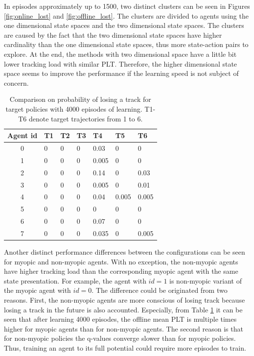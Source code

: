 \documentclass[english, 12pt, a4paper, elec, utf8, a-1b, online]{aaltothesis}
\begin{document}
In episodes approximately up to 1500, two distinct clusters can be seen in Figures \ref{fig:online_lost} and \ref{fig:offline_lost}.
The clusters are divided to agents using the one dimensional state spaces and the two dimensional state spaces.
The clusters are caused by the fact that the two dimensional state spaces have higher cardinality than the one dimensional state spaces, thus more state-action pairs to explore.
At the end, the methods with two dimensional space have a little bit lower tracking load with similar PLT.
Therefore, the higher dimensional state space seems to improve the performance if the learning speed is not subject of concern.

\begin{table}[tb]
    \centering
    \begin{tabular}{|c|l|l|l|l|l|l|}
        \hline
        \textbf{Agent id} & \textbf{T1} & \textbf{T2} & \textbf{T3} & \textbf{T4} & \textbf{T5} & \textbf{T6} \\ \hline
        0 & 0 & 0 & 0 & 0.03  & 0     & 0     \\ \hline
        1 & 0 & 0 & 0 & 0.005 & 0     & 0     \\ \hline
        2 & 0 & 0 & 0 & 0.14  & 0     & 0.03  \\ \hline
        3 & 0 & 0 & 0 & 0.005 & 0     & 0.01  \\ \hline
        4 & 0 & 0 & 0 & 0.04  & 0.005 & 0.005 \\ \hline
        5 & 0 & 0 & 0 & 0     & 0     & 0     \\ \hline
        6 & 0 & 0 & 0 & 0.07  & 0     & 0     \\ \hline
        7 & 0 & 0 & 0 & 0.035 & 0     & 0.005 \\ \hline
    \end{tabular}
    \caption{Comparison on probability of losing a track for target policies with 4000 episodes of learning. T1-T6 denote target trajectories from 1 to 6.}
    \label{tab:plt_comparison}
\end{table}

Another distinct performance differences between the configurations can be seen for myopic and non-myopic agents.
With no exception, the non-myopic agents have higher tracking load than the corresponding myopic agent with the same state presentation. 
For example, the agent with $id=1$ is non-myopic variant of the myopic agent with $id=0$.
The difference could be originated from two reasons.
First, the non-myopic agents are more conscious of losing track because losing a track in the future is also accounted.
Especially, from Table \ref{tab:plt_comparison} it can be seen that after learning 4000 episodes, the offline mean PLT is multiple times higher for myopic agents than for non-myopic agents.
The second reason is that for non-myopic policies the q-values converge slower than for myopic policies. Thus, training an agent to its full potential could require more episodes to train.
\end{document}
